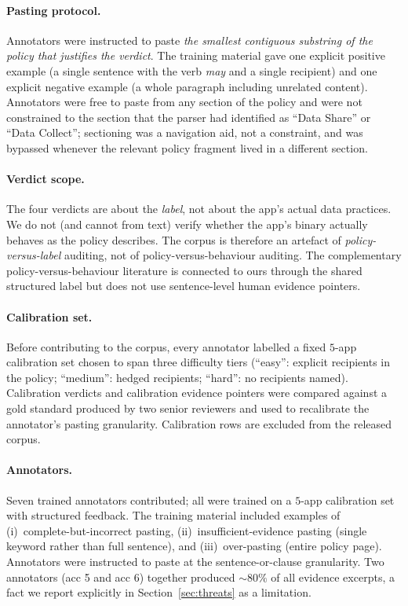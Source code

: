 \documentclass[11pt,a4paper]{article}
\newcommand{\dec}[1]{\textsf{#1}}
\begin{document}
\paragraph{Pasting protocol.}
Annotators were instructed to paste \emph{the smallest contiguous
substring of the policy that justifies the verdict}. The training
material gave one explicit positive example (a single sentence with
the verb \emph{may} and a single recipient) and one explicit negative
example (a whole paragraph including unrelated content). Annotators
were free to paste from any section of the policy and were not
constrained to the section that the parser had identified as
``Data Share'' or ``Data Collect''; sectioning was a navigation aid,
not a constraint, and was bypassed whenever the relevant policy
fragment lived in a different section.

\paragraph{Verdict scope.}
The four verdicts are about the \emph{label}, not about the app's
actual data practices. We do not (and cannot from text) verify
whether the app's binary actually behaves as the policy describes.
The corpus is therefore an artefact of \emph{policy-versus-label}
auditing, not of policy-versus-behaviour auditing. The complementary
policy-versus-behaviour literature
\citep{andow2020policheck,zimmeck2019maps,ren2018bug,razaghpanah2018apps}
is connected to ours through the shared structured label but does not
use sentence-level human evidence pointers.

\paragraph{Calibration set.}
Before contributing to the corpus, every annotator labelled a fixed
$5$-app calibration set chosen to span three difficulty tiers
(``easy'': explicit recipients in the policy; ``medium'': hedged
recipients; ``hard'': no recipients named). Calibration verdicts and
calibration evidence pointers were compared against a gold standard
produced by two senior reviewers and used to recalibrate the
annotator's pasting granularity. Calibration rows are excluded from
the released corpus.

\paragraph{Annotators.}
Seven trained annotators contributed; all were trained on a $5$-app
calibration set with structured feedback. The training material
included examples of (i)~complete-but-incorrect pasting,
(ii)~insufficient-evidence pasting (single keyword rather than full
sentence), and (iii)~over-pasting (entire policy page). Annotators
were instructed to paste at the sentence-or-clause granularity. Two
annotators (\dec{acc 5} and \dec{acc 6}) together produced $\sim80\%$
of all evidence excerpts, a fact we report explicitly in
Section~\ref{sec:threats} as a limitation.
\end{document}
